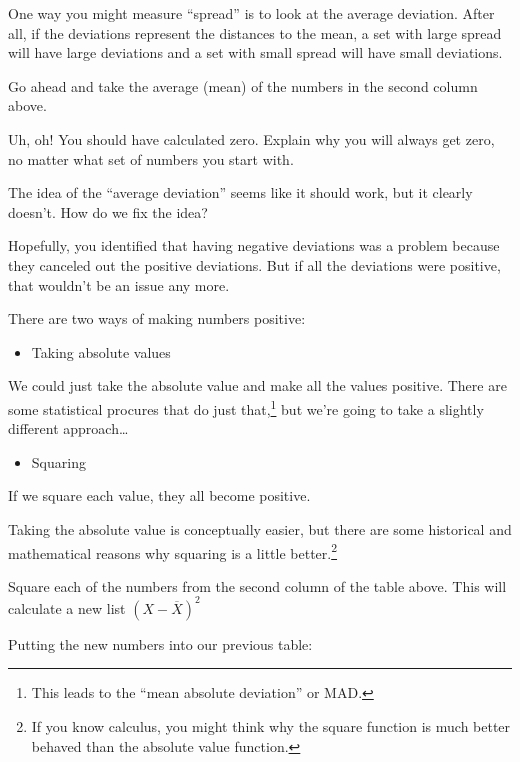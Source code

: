 \documentclass[
]{book}
\providecommand{\tightlist}{%
  \setlength{\itemsep}{0pt}\setlength{\parskip}{0pt}}
\begin{document}
One way you might measure ``spread'' is to look at the average deviation. After all, if the deviations represent the distances to the mean, a set with large spread will have large deviations and a set with small spread will have small deviations.

Go ahead and take the average (mean) of the numbers in the second column above.

Uh, oh! You should have calculated zero. Explain why you will always get zero, no matter what set of numbers you start with.

The idea of the ``average deviation'' seems like it should work, but it clearly doesn't. How do we fix the idea?

Hopefully, you identified that having negative deviations was a problem because they canceled out the positive deviations. But if all the deviations were positive, that wouldn't be an issue any more.

There are two ways of making numbers positive:

\begin{itemize}
\tightlist
\item
  Taking absolute values
\end{itemize}

We could just take the absolute value and make all the values positive. There are some statistical procures that do just that,\footnote{This leads to the ``mean absolute deviation'' or MAD.} but we're going to take a slightly different approach\ldots{}

\begin{itemize}
\tightlist
\item
  Squaring
\end{itemize}

If we square each value, they all become positive.

Taking the absolute value is conceptually easier, but there are some historical and mathematical reasons why squaring is a little better.\footnote{If you know calculus, you might think why the square function is much better behaved than the absolute value function.}

Square each of the numbers from the second column of the table above. This will calculate a new list \(\left(X - \overline{X}\right)^{2}\)

Putting the new numbers into our previous table:
\end{document}
